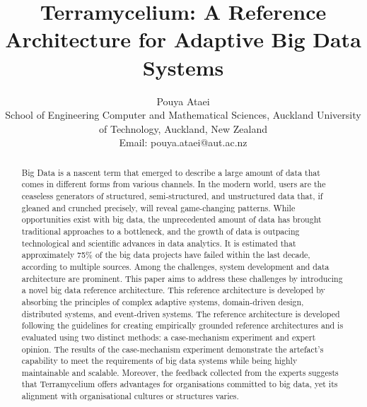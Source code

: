 \documentclass{ieeeaccess}
\begin{document}


\title{Terramycelium: A Reference Architecture for Adaptive Big Data Systems}

\author{Pouya Ataei\\
School of Engineering
Computer and Mathematical
Sciences, Auckland University
of Technology, Auckland, New
Zealand \\ Email: pouya.ataei@aut.ac.nz
}

\maketitle

\begin{abstract}

  Big Data is a nascent term that emerged to describe a large amount of data that comes in different forms from various channels. In the modern world, users are the ceaseless generators of structured, semi-structured, and unstructured data that, if gleaned and crunched precisely, will reveal game-changing patterns. While opportunities exist with big data, the unprecedented amount of data has brought traditional approaches to a bottleneck, and the growth of data is outpacing technological and scientific advances in data analytics. It is estimated that approximately 75\% of the big data projects have failed within the last decade, according to multiple sources. Among the challenges, system development and data architecture are prominent. This paper aims to address these challenges by introducing a novel big data reference architecture. This reference architecture is developed by absorbing the principles of complex adaptive systems, domain-driven design, distributed systems, and event-driven systems. The reference architecture is developed following the guidelines for creating empirically grounded reference architectures and is evaluated using two distinct methods: a case-mechanism experiment and expert opinion. The results of the case-mechanism experiment demonstrate the artefact's capability to meet the requirements of big data systems while being highly maintainable and scalable. Moreover, the feedback collected from the experts suggests that Terramycelium offers advantages for organisations committed to big data, yet its alignment with organisational cultures or structures varies.

\end{abstract}
\end{document}
